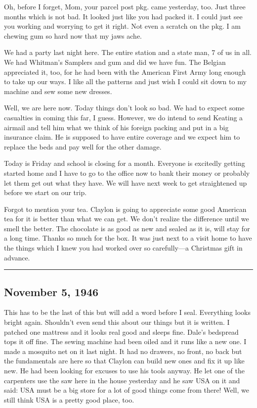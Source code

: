 \documentclass[
]{book}
\begin{document}
Oh, before I forget, Mom, your parcel post pkg. came yesterday, too. Just three months which is not bad. It looked just like you had packed it. I could just see you working and worrying to get it right. Not even a scratch on the pkg. I am chewing gum so hard now that my jaws ache.

We had a party last night here. The entire station and a state man, 7 of us in all. We had Whitman's Samplers and gum and did we have fun. The Belgian appreciated it, too, for he had been with the American First Army long enough to take up our ways. I like all the patterns and just wish I could sit down to my machine and sew some new dresses.

Well, we are here now. Today things don't look so bad. We had to expect some casualties in coming this far, I guess. However, we do intend to send Keating a airmail and tell him what we think of his foreign packing and put in a big insurance claim. He is supposed to have entire coverage and we expect him to replace the beds and pay well for the other damage.

Today is Friday and school is closing for a month. Everyone is excitedly getting started home and I have to go to the office now to bank their money or probably let them get out what they have. We will have next week to get straightened up before we start on our trip.

Forgot to mention your tea. Claylon is going to appreciate some good American tea for it is better than what we can get. We don't realize the difference until we smell the better. The chocolate is as good as new and sealed as it is, will stay for a long time. Thanks so much for the box. It was just next to a visit home to have the things which I knew you had worked over so carefully---a Christmas gift in advance.

\begin{center}\rule{0.5\linewidth}{0.5pt}\end{center}

\hypertarget{november-5-1946}{%
\subsection{November 5, 1946}\label{november-5-1946}}

This has to be the last of this but will add a word before I seal. Everything looks bright again. Shouldn't even send this about our things but it is written. I patched one mattress and it looks real good and sleeps fine. Dale's bedspread tops it off fine. The sewing machine had been oiled and it runs like a new one. I made a mosquito net on it last night. It had no drawers, no front, no back but the fundamentals are here so that Claylon can build new ones and fix it up like new. He had been looking for excuses to use his tools anyway. He let one of the carpenters use the saw here in the house yesterday and he saw USA on it and said: USA must be a big store for a lot of good things come from there! Well, we still think USA is a pretty good place, too.
\end{document}
